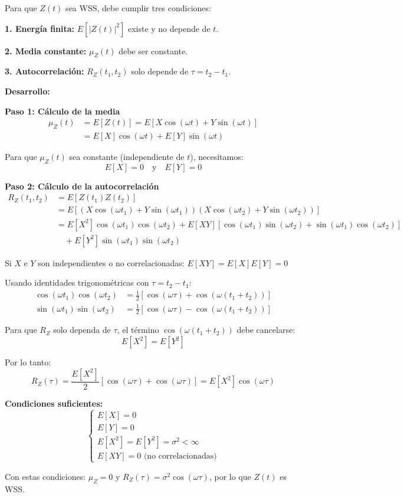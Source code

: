 \documentclass[10pt,a4paper]{article}
\begin{document}
\begin{solucion}
Para que $Z(t)$ sea WSS, debe cumplir tres condiciones:

\textbf{1. Energía finita:} $E[|Z(t)|^2]$ existe y no depende de $t$.

\textbf{2. Media constante:} $\mu_Z(t)$ debe ser constante.

\textbf{3. Autocorrelación:} $R_Z(t_1, t_2)$ solo depende de $\tau = t_2 - t_1$.

\vspace{3mm}
\textbf{Desarrollo:}

\textbf{Paso 1: Cálculo de la media}
\begin{align*}
\mu_Z(t) &= E[Z(t)] = E[X \cos(\omega t) + Y \sin(\omega t)]\\
&= E[X] \cos(\omega t) + E[Y] \sin(\omega t)
\end{align*}

Para que $\mu_Z(t)$ sea constante (independiente de $t$), necesitamos:
\[
\boxed{E[X] = 0 \quad \text{y} \quad E[Y] = 0}
\]

\textbf{Paso 2: Cálculo de la autocorrelación}
\begin{align*}
R_Z(t_1, t_2) &= E[Z(t_1) Z(t_2)]\\
&= E[(X \cos(\omega t_1) + Y \sin(\omega t_1))(X \cos(\omega t_2) + Y \sin(\omega t_2))]\\
&= E[X^2] \cos(\omega t_1) \cos(\omega t_2) + E[XY][\cos(\omega t_1)\sin(\omega t_2) + \sin(\omega t_1)\cos(\omega t_2)]\\
&\quad + E[Y^2] \sin(\omega t_1) \sin(\omega t_2)
\end{align*}

Si $X$ e $Y$ son independientes o no correlacionadas: $E[XY] = E[X]E[Y] = 0$

Usando identidades trigonométricas con $\tau = t_2 - t_1$:
\begin{align*}
\cos(\omega t_1)\cos(\omega t_2) &= \frac{1}{2}[\cos(\omega\tau) + \cos(\omega(t_1+t_2))]\\
\sin(\omega t_1)\sin(\omega t_2) &= \frac{1}{2}[\cos(\omega\tau) - \cos(\omega(t_1+t_2))]
\end{align*}

Para que $R_Z$ solo dependa de $\tau$, el término $\cos(\omega(t_1+t_2))$ debe cancelarse:
\[
E[X^2] = E[Y^2]
\]

Por lo tanto:
\[
R_Z(\tau) = \frac{E[X^2]}{2}[\cos(\omega\tau) + \cos(\omega\tau)] = E[X^2]\cos(\omega\tau)
\]

\vspace{3mm}
\textbf{Condiciones suficientes:}
\[
\boxed{\begin{cases}
E[X] = 0\\
E[Y] = 0\\
E[X^2] = E[Y^2] = \sigma^2 < \infty\\
E[XY] = 0 \text{ (no correlacionadas)}
\end{cases}}
\]

Con estas condiciones: $\mu_Z = 0$ y $R_Z(\tau) = \sigma^2 \cos(\omega\tau)$, por lo que $Z(t)$ es WSS.
\end{solucion}
\end{document}
